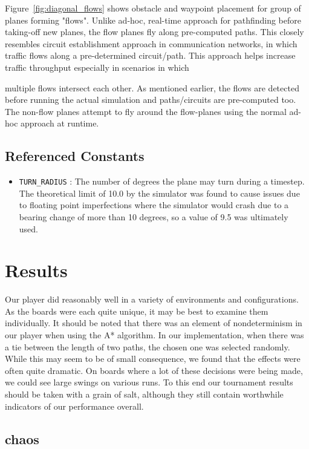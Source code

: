 \documentclass[10pt]{article}
\newcommand{\ms}[1] {
  \texttt{#1}
}
\begin{document}
Figure~\ref{fig:diagonal_flows} shows obstacle and waypoint placement
for group of planes forming "flows". Unlike ad-hoc, real-time approach for
pathfinding before taking-off new planes, the flow planes fly along pre-computed
paths. This closely resembles circuit establishment approach in communication
networks, in which traffic flows along a pre-determined circuit/path. This
approach helps increase traffic throughput especially in scenarios in which

multiple flows intersect each other. As mentioned earlier, the flows are
detected before running the actual simulation and paths/circuits are
pre-computed too. The non-flow planes attempt to fly around the flow-planes
using the normal ad-hoc approach at runtime.



\subsection{Referenced Constants}
\begin{itemize}
  \item \ms{TURN\_RADIUS}: The number of degrees the plane may turn during a timestep. The theoretical limit of 
    10.0 by the simulator was found to cause issues due to floating point imperfections where the simulator would
    crash due to a bearing change of more than 10 degrees, so a value of 9.5 was ultimately used.
\end{itemize}


\newpage
\section{Results}

Our player did reasonably well in a variety of environments and configurations. As the boards were each quite unique, it may be best to examine them individually. It should be noted that there was an element of nondeterminism in our player when using the A* algorithm. In our implementation, when there was a tie between the length of two paths, the chosen one was selected randomly. While this may seem to be of small consequence, we found that the effects were often quite dramatic. On boards where a lot of these decisions were being made, we could see large swings on various runs. To this end our tournament results should be taken with a grain of salt, although they still contain worthwhile indicators of our performance overall.

\subsection{chaos}
\end{document}
